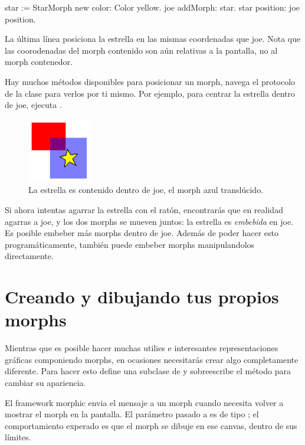 \documentclass[a4paper,10pt,twoside]{book}
\begin{document}
\begin{code}{}
star := StarMorph new color: Color yellow.
joe addMorph: star.
star position: joe position.
\end{code}

\noindent
La \'ultima l\'inea posiciona la estrella en las mismas coordenadas que joe.
Nota que las coorodenadas del morph contenido son a\'un relativas a la pantalla, no al morph contenedor.

Hay muchos m\'etodos disponibles para posicionar un morph, navega el protocolo  de la clase  para verlos por ti mismo.
Por ejemplo,
para centrar la estrella dentro de joe, ejecuta   .

\begin{figure}[ht]
	\centerline{\includegraphics{joeStar}}
	\caption{La estrella es contenido dentro de joe, el morph azul transl\'ucido.
		}
\end{figure}

Si ahora intentas agarrar la estrella con el rat\'on, encontrar\'as que en realidad agarras a joe, y los dos morphs se mueven juntos: la estrella es \emph{embebida} en joe.
Es posible embeber m\'as morphs dentro de joe.
Adem\'as de poder hacer esto program\'aticamente, tambi\'en puede embeber morphs manipulandolos directamente.

\section{Creando y dibujando tus propios morphs}

Mientras que es posible hacer muchas utilies e interesantes representaciones gr\'aficas componiendo morphs, en ocasiones necesitar\'as crear algo completamente diferente.
Para hacer esto define una subclase de  y sobreescribe el m\'etodo  para cambiar su apariencia.

El framework morphic envia el mensaje  a un morph cuando necesita volver a mostrar el morph en la pantalla. El par\'ametro pasado a  es de tipo ; el comportamiento experado es que el morph se dibuje en ese canvas, dentro de sus límites.
\end{document}

